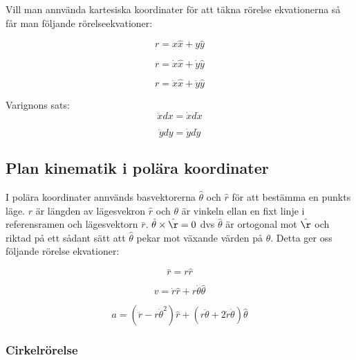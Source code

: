 \documentclass[a4paper,12pt]{article}
\begin{document}
Vill man annvända kartesiska koordinater för att täkna rörelse ekvationerna så får man 
följande rörelseekvationer:

\begin{equation}
r = x\hat{x} + y\hat{y}
\end{equation}

\begin{equation}
r = \dot{x}\hat{x} + \dot{y}\hat{y}
\end{equation}

\begin{equation}
r = \ddot{x}\hat{x} + \ddot{y}\hat{y}
\end{equation}

Varignons sats:
\begin{equation}
\ddot{x}dx = \dot{x}d\dot{x}
\end{equation}

\begin{equation}
\ddot{y}dy = \dot{y}d\dot{y}
\end{equation}

\subsection{Plan kinematik i polära koordinater}
I polära koordinater annvänds basvektorerna 
$\hat{\theta}$ och $\hat{r}$ för att bestämma en punkts läge. 
$r$ är längden av lägesvekron $\hat{r}$ och $\theta$ är vinkeln 
ellan en fixt linje i referensramen och lägesvektorn $\bar{r}$. 
$\hat{\theta} \times \hat{\r}= 0$ dvs $\hat{\theta}$  är 
ortogonal mot $\hat{\r}$ och riktad på ett sådant sätt att
$\hat{\theta}$ pekar mot växande värden på $\theta$.
Detta ger oss följande rörelse ekvationer:

\begin{equation}
\bar{r}=r\hat{r}
\end{equation}

\begin{equation}
v = \dot{r}\hat{r} + r\dot{\theta}\hat{\theta}
\end{equation}

\begin{equation}
a = (\ddot{r}-r\dot{\theta}^2)\hat{r}+(r\ddot{\theta}+2\dot{r}\dot{\theta})\hat{\theta}
\end{equation}

\subsubsection{Cirkelrörelse}
\end{document}
